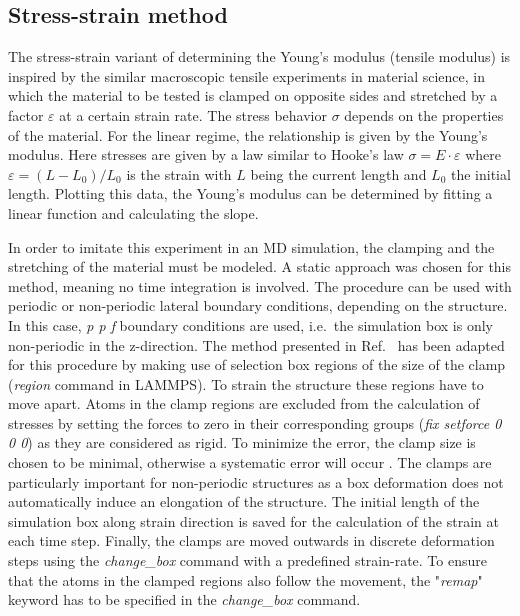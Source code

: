 \documentclass[preprint,12pt]{elsarticle}
\begin{document}
\subsection{Stress-strain method}
\label{sec-2-3}
The stress-strain variant of determining the Young's modulus (tensile modulus) is inspired 
by the similar macroscopic tensile experiments in material science, in which the material 
to be tested is clamped on opposite sides and stretched by a factor $\varepsilon$  at a certain strain rate. 
The stress behavior $\sigma$ depends on the properties of the material.
For the linear regime, the relationship is given by the Young's modulus. 
Here stresses are given by a law similar to Hooke's law $\sigma = E \cdot \varepsilon$ 
where $\varepsilon=(L-L_0)/L_0$ is the strain with $L$ being
the current length and $L_0$ the initial length. Plotting this data, 
the Young's modulus can be determined by fitting a linear function and calculating the slope.

In order to imitate this experiment in an MD simulation, the clamping and the 
stretching of the material must be modeled. A static approach was chosen 
for this method, meaning no time integration is involved. The procedure can be used 
with periodic or non-periodic lateral boundary conditions, depending on the structure. 
In this case, \textit{p p f} boundary conditions are used, i.e.\ the simulation box 
is only non-periodic in the z-direction. The method presented in Ref.~\cite{Tschopp} 
has been adapted for this procedure by making use of selection box regions 
of the size of the clamp (\textit{region} command in LAMMPS). 
To strain the structure these regions have to move apart. Atoms in the clamp regions 
are excluded from the calculation of stresses by setting the forces to zero 
in their corresponding groups (\textit{fix setforce 0 0 0}) as they are considered as rigid. 
To minimize the error, the clamp size is chosen to be minimal, 
otherwise a systematic error will occur \cite{Mihlan:B21}. 
The clamps are particularly important for non-periodic structures 
as a box deformation does not automatically induce an elongation of the structure.
The initial length of the simulation box along strain direction is saved for 
the calculation of the strain at each time step. Finally, the clamps are moved 
outwards in discrete deformation steps using the \textit{change\_box} command 
with a predefined strain-rate. To ensure that the atoms in the clamped regions also 
follow the movement, the "\textit{remap}" keyword has to be specified in 
the \textit{change\_box} command.
\end{document}
